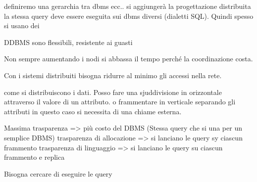 definiremo una gerarchia tra dbms ecc..
si aggiungerà la progettazione distribuita la stessa query deve essere eseguita 
sui dbms diversi (dialetti SQL). Quindi spesso si usano dei 

DDBMS sono flessibili, resistente ai guasti


Non sempre aumentando i nodi si abbassa il tempo perché la coordinazione costa.

Con i sistemi distribuiti bisogna ridurre al minimo gli accessi nella rete.

come si distribuiscono i dati.
Posso fare una sjuddivisione in orizzontale attraverso il valore di un attributo.
o frammentare in verticale separando gli attributi in questo caso si necessita di
una chiame esterna.

Massima trasparenza => più costo del DBMS (Stessa query che si una per un semplice DBMS)
trasparenza di allocazione => si lanciano le query sy ciascun frammento 
trasparenza di linguaggio => si lanciano le query su ciascun frammento e replica

Bisogna cercare di eseguire le query 
